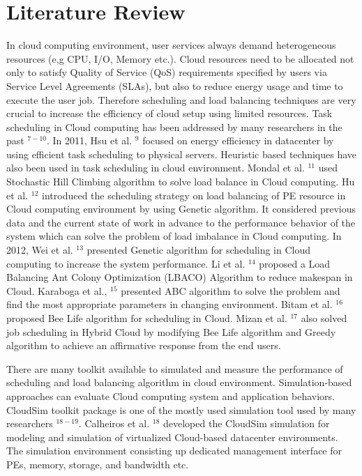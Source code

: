 \documentclass[10pt]{article}
\begin{document}
\section{Literature Review}
In cloud computing environment, user services always demand heterogeneous resources (e,g CPU, I/O, Memory etc.). Cloud resources need to be allocated not only to satisfy Quality of Service (QoS) requirements specified by users via Service Level Agreements (SLAs), but also to reduce energy usage and time to execute the user job. Therefore scheduling and load balancing techniques are very crucial to increase the efficiency of cloud setup using limited resources. Task scheduling in Cloud computing has been addressed by many researchers in the past ${ }^{7-10}$. In 2011, Hsu et al. ${ }^{9}$ focused on energy efficiency in datacenter by using efficient task scheduling to physical servers. Heuristic based techniques have also been used in task scheduling in cloud environment. Mondal et al. ${ }^{11}$ used Stochastic Hill Climbing algorithm to solve load balance in Cloud computing. Hu et al. ${ }^{12}$ introduced the scheduling strategy on load balancing of PE resource in Cloud computing environment by using Genetic algorithm. It considered previous data and the current state of work in advance to the performance behavior of the system which can solve the problem of load imbalance in Cloud computing. In 2012, Wei et al. ${ }^{13}$ presented Genetic algorithm for scheduling in Cloud computing to increase the system performance. Li et al. ${ }^{14}$ proposed a Load Balancing Ant Colony Optimization (LBACO) Algorithm to reduce makespan in Cloud. Karaboga et al., ${ }^{15}$ presented ABC algorithm to solve the problem and find the most appropriate parameters in changing environment. Bitam et al. ${ }^{16}$ proposed Bee Life algorithm for scheduling in Cloud. Mizan et al. ${ }^{17}$ also solved job scheduling in Hybrid Cloud by modifying Bee Life algorithm and Greedy algorithm to achieve an affirmative response from the end users.

There are many toolkit available to simulated and measure the performance of scheduling and load balancing algorithm in cloud environment. Simulation-based approaches can evaluate Cloud computing system and application behaviors. CloudSim toolkit package is one of the mostly used simulation tool used by many researchers ${ }^{18-19}$. Calheiros et al. ${ }^{18}$ developed the CloudSim simulation for modeling and simulation of virtualized Cloud-based datacenter environments. The simulation environment consisting up dedicated management interface for PEs, memory, storage, and bandwidth etc.
\end{document}
